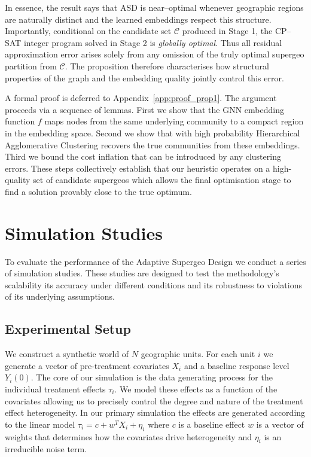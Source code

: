 \documentclass[final,3p,fleqn, 10pt]{elsarticle}
\begin{document}
    In essence, the result says that ASD is near–optimal whenever geographic regions are naturally distinct and the learned embeddings respect this structure. Importantly, conditional on the candidate set $\mathcal{C}$ produced in Stage 1, the CP--SAT integer program solved in Stage 2 is \emph{globally optimal}. Thus all residual approximation error arises solely from any omission of the truly optimal supergeo partition from $\mathcal{C}$. The proposition therefore characterises how structural properties of the graph and the embedding quality jointly control this error.

    A formal proof is deferred to Appendix~\ref{app:proof_prop1}. The argument proceeds via a sequence of lemmas. First we show that the GNN embedding function $f$ maps nodes from the same underlying community to a compact region in the embedding space. Second we show that with high probability Hierarchical Agglomerative Clustering recovers the true communities from these embeddings. Third we bound the cost inflation that can be introduced by any clustering errors. These steps collectively establish that our heuristic operates on a high-quality set of candidate supergeos which allows the final optimisation stage to find a solution provably close to the true optimum.

\section{Simulation Studies}
\label{sec:simulations}

To evaluate the performance of the Adaptive Supergeo Design we conduct a series of simulation studies. These studies are designed to test the methodology's scalability its accuracy under different conditions and its robustness to violations of its underlying assumptions.

    \subsection{Experimental Setup}
    We construct a synthetic world of $N$ geographic units. For each unit $i$ we generate a vector of pre-treatment covariates $X_i$ and a baseline response level $Y_i(0)$. The core of our simulation is the data generating process for the individual treatment effects $\tau_i$. We model these effects as a function of the covariates allowing us to precisely control the degree and nature of the treatment effect heterogeneity. In our primary simulation the effects are generated according to the linear model $\tau_i = c + w^T X_i + \eta_i$ where $c$ is a baseline effect $w$ is a vector of weights that determines how the covariates drive heterogeneity and $\eta_i$ is an irreducible noise term.
\end{document}

